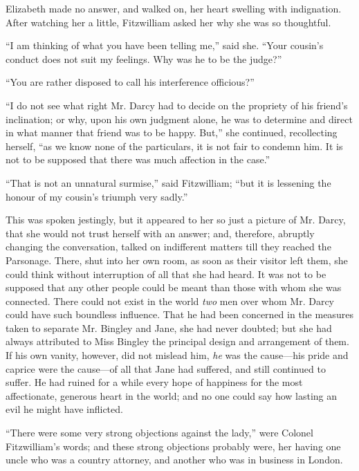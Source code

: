 \documentclass[12pt]{book}
\begin{document}
Elizabeth made no answer, and walked on, her heart swelling with indignation. After watching her a little, Fitzwilliam asked her why she was so thoughtful.

``I am thinking of what you have been telling me,'' said she. ``Your cousin's conduct does not suit my feelings. Why was he to be the judge?''

``You are rather disposed to call his interference officious?''

``I do not see what right Mr. Darcy had to decide on the propriety of his friend's inclination; or why, upon his own judgment alone, he was to determine and direct in what manner that friend was to be happy. But,'' she continued, recollecting herself, ``as we know none of the particulars, it is not fair to condemn him. It is not to be supposed that there was much affection in the case.''

``That is not an unnatural surmise,'' said Fitzwilliam; ``but it is lessening the honour of my cousin's triumph very sadly.''

This was spoken jestingly, but it appeared to her so just a picture of Mr. Darcy, that she would not trust herself with an answer; and, therefore, abruptly changing the conversation, talked on indifferent matters till they reached the Parsonage. There, shut into her own room, as soon as their visitor left them, she could think without interruption of all that she had heard. It was not to be supposed that any other people could be meant than those with whom she was connected. There could not exist in the world \textit{two} men over whom Mr. Darcy could have such boundless influence. That he had been concerned in the measures taken to separate Mr. Bingley and Jane, she had never doubted; but she had always attributed to Miss Bingley the principal design and arrangement of them. If his own vanity, however, did not mislead him, \textit{he} was the cause---his pride and caprice were the cause---of all that Jane had suffered, and still continued to suffer. He had ruined for a while every hope of happiness for the most affectionate, generous heart in the world; and no one could say how lasting an evil he might have inflicted.

``There were some very strong objections against the lady,'' were Colonel Fitzwilliam's words; and these strong objections probably were, her having one uncle who was a country attorney, and another who was in business in London.
\end{document}
